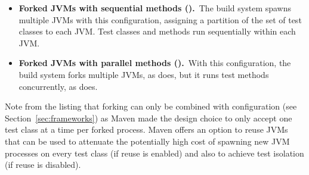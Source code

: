 \begin{itemize}
\item
  \textbf{Forked JVMs with sequential methods (\ForkSeq).}~The build
  system spawns multiple JVMs with this configuration, assigning a
  partition of the set of test classes to each JVM.  Test classes and methods
  run sequentially within each JVM.
\item
  \textbf{Forked JVMs with parallel methods (\ForkParMeth).}~With
  this configuration, the build system forks multiple JVMs, as
  \ForkSeq{} does, but it runs test methods concurrently, as
  \SeqClassParMeth{} does.
\end{itemize}


Note from the listing that forking can only be combined with
configuration \SeqClassParMeth{} (see Section~\ref{sec:frameworks}) as
Maven made the design choice to only accept one test class at a time
per forked process.  Maven offers an option to reuse JVMs that can be
used to attenuate the potentially high cost of spawning new JVM
processes on every test class (if reuse is enabled) and also to
achieve test isolation (if reuse is disabled).

